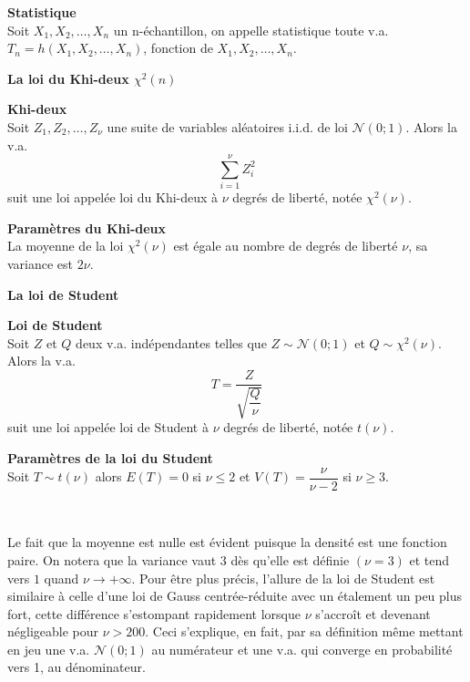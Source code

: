 \documentclass[../PolyS4.tex]{subfiles}
\begin{document}
\begin{Def} {\textbf{Statistique}}\\
 Soit $X_1,X_2, \dots,X_n$ un n-échantillon, on appelle statistique
toute v.a. $T_n = h(X_1,X_2, \dots,X_n)$, fonction de $X_1,X_2, \dots,X_n$.
\end{Def}

\textbf{ La loi du Khi-deux $\chi^2(n)$}

\begin{Def} {\textbf{Khi-deux}}\\
 Soit $Z_1, Z_2, \dots,Z_\nu$ une suite de variables aléatoires i.i.d. de loi $\mathcal{N}(0 ; 1)$. Alors la v.a.  $$\sum_{i=1}^\nu Z_i^2$$
suit une loi appelée loi du Khi-deux à $\nu$ degrés de liberté, notée $\chi^2(\nu)$.

\end{Def}


\begin{Prop} {\textbf{Paramètres du Khi-deux}}\\

La moyenne de la loi $\chi^2(\nu)$ est égale au nombre de degrés
de liberté $\nu$, sa variance est $2\nu$.
\end{Prop}


\textbf{ La loi de Student}



\begin{Def} {\textbf{Loi de Student}}\\
Soit $Z$ et $Q$ deux v.a. indépendantes telles que $Z \sim \mathcal{N}(0 ; 1)$
et $Q \sim \chi^2(\nu)$. Alors la v.a. $$T =\dfrac{Z}{\sqrt{\dfrac{Q}{\nu}}}$$
suit une loi appelée loi de Student à $\nu$ degrés de liberté, notée $t(\nu)$.
\end{Def}


\begin{Prop} {\textbf{Paramètres de la loi du Student}}\\
Soit $T \sim t(\nu)$ alors $E(T) = 0$ si $\nu \leq 2$ et $V (T) =\dfrac{\nu}{\nu-2}$ si $\nu \geq 3$.
\end{Prop}

\begin{Rmq}$\,$

Le fait que la moyenne est nulle est évident puisque la densité est une fonction paire. On notera que la variance vaut 3 dès qu'elle est définie $(\nu = 3)$ et tend vers $1$ quand $\nu \to +\infty$. Pour être plus précis, l'allure de la loi de Student est similaire à celle d'une loi de Gauss centrée-réduite avec un étalement un peu plus fort, cette différence s'estompant rapidement lorsque $\nu$ s'accroît et devenant négligeable pour $\nu > 200$. Ceci s'explique, en fait, par sa définition même mettant en jeu une v.a. $\mathcal{N}(0 ; 1)$ au numérateur et une v.a. qui converge en probabilité vers 1, au dénominateur.
\end{Rmq}
\end{document}
